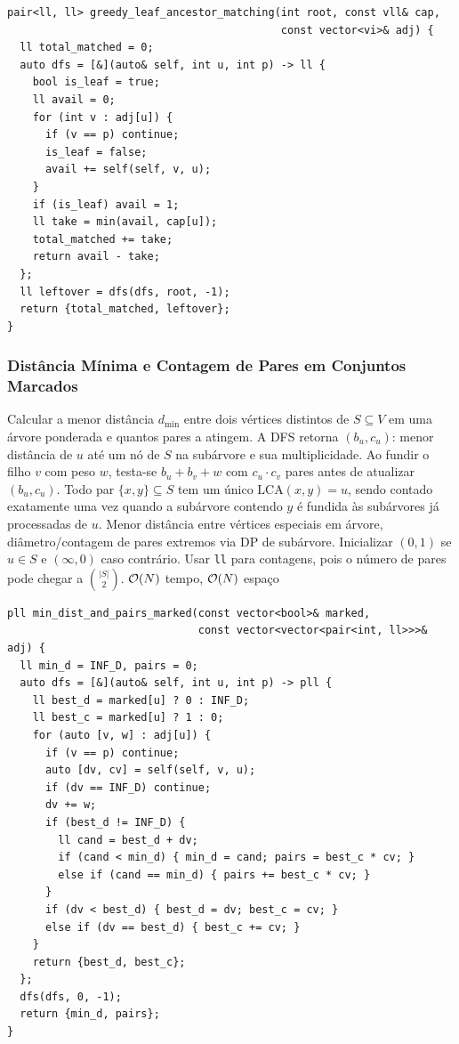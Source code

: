 \begin{lstlisting}
pair<ll, ll> greedy_leaf_ancestor_matching(int root, const vll& cap,
                                           const vector<vi>& adj) {
  ll total_matched = 0;
  auto dfs = [&](auto& self, int u, int p) -> ll {
    bool is_leaf = true;
    ll avail = 0;
    for (int v : adj[u]) {
      if (v == p) continue;
      is_leaf = false;
      avail += self(self, v, u);
    }
    if (is_leaf) avail = 1;
    ll take = min(avail, cap[u]);
    total_matched += take;
    return avail - take;
  };
  ll leftover = dfs(dfs, root, -1);
  return {total_matched, leftover};
}
\end{lstlisting}

\subsubsection{Distância Mínima e Contagem de Pares em Conjuntos Marcados}
\algobox
  {Calcular a menor distância $d_{\min}$ entre dois vértices distintos de $S \subseteq V$ em uma árvore ponderada e quantos pares a atingem.}
  {A DFS retorna $(b_u, c_u)$: menor distância de $u$ até um nó de $S$ na subárvore e sua multiplicidade. Ao fundir o filho $v$ com peso $w$, testa-se $b_u + b_v + w$ com $c_u \cdot c_v$ pares antes de atualizar $(b_u, c_u)$.}
  {Todo par $\{x, y\} \subseteq S$ tem um único $\text{LCA}(x, y) = u$, sendo contado exatamente uma vez quando a subárvore contendo $y$ é fundida às subárvores já processadas de $u$.}
  {Menor distância entre vértices especiais em árvore, diâmetro/contagem de pares extremos via DP de subárvore.}
  {Inicializar $(0, 1)$ se $u \in S$ e $(\infty, 0)$ caso contrário. Usar \texttt{ll} para contagens, pois o número de pares pode chegar a $\binom{|S|}{2}$.}
  {$\mathcal{O}(N)$ tempo, $\mathcal{O}(N)$ espaço}

\begin{lstlisting}
pll min_dist_and_pairs_marked(const vector<bool>& marked,
                              const vector<vector<pair<int, ll>>>& adj) {
  ll min_d = INF_D, pairs = 0;
  auto dfs = [&](auto& self, int u, int p) -> pll {
    ll best_d = marked[u] ? 0 : INF_D;
    ll best_c = marked[u] ? 1 : 0;
    for (auto [v, w] : adj[u]) {
      if (v == p) continue;
      auto [dv, cv] = self(self, v, u);
      if (dv == INF_D) continue;
      dv += w;
      if (best_d != INF_D) {
        ll cand = best_d + dv;
        if (cand < min_d) { min_d = cand; pairs = best_c * cv; }
        else if (cand == min_d) { pairs += best_c * cv; }
      }
      if (dv < best_d) { best_d = dv; best_c = cv; }
      else if (dv == best_d) { best_c += cv; }
    }
    return {best_d, best_c};
  };
  dfs(dfs, 0, -1);
  return {min_d, pairs};
}
\end{lstlisting}

